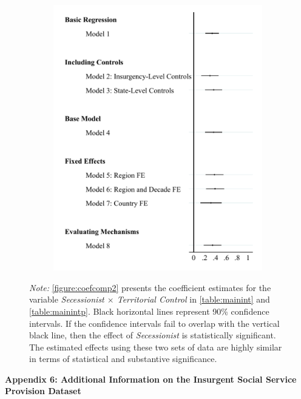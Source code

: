 \documentclass[12pt, letterpaper]{article}
\begin{document}
\begin{figure}[h]
\begin{subfigure}{0.45\textwidth}
    \includegraphics[width=\textwidth]{coefpanelint.pdf}
    \end{subfigure}
  \begin{tablenotes}
\raggedright \footnotesize{\textit{Note:} \autoref{figure:coefcomp2} presents the coefficient estimates for the variable \textit{Secessionist  $\times$ Territorial Control} in \autoref{table:mainint} and \autoref{table:mainintp}. Black horizontal lines represent 90\% confidence intervals. If the confidence intervals fail to overlap with the vertical black line, then the effect of \textit{Secessionist} is statistically significant. The estimated effects using these two sets of data are highly similar in terms of statistical and substantive significance.}
\end{tablenotes}
\end{figure}


\newpage
\clearpage
\thispagestyle{plain}
\begin{center}
\Large{\textbf{Appendix 6: Additional Information on the Insurgent Social Service Provision Dataset}}
\end{center}
\end{document}
